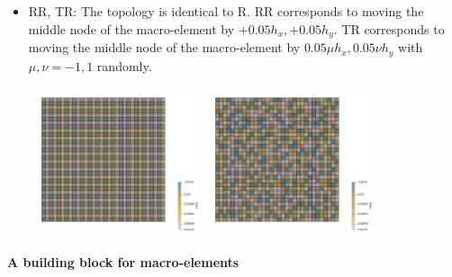 \begin{itemize}
\item RR, TR: The topology is identical to R. 
RR corresponds to moving the middle node of the macro-element by $+0.05h_x,+0.05h_y$.
TR corresponds to moving the middle node of the macro-element by $0.05\mu h_x,0.05\nu h_y$
with $\mu,\nu=-1,1$ randomly.

\begin{center}
\includegraphics[width=5cm]{python_codes/fieldstone_78/images/16x16/area8.png}
\includegraphics[width=5cm]{python_codes/fieldstone_78/images/16x16/area9.png}
\end{center}

\end{itemize}




\paragraph{A building block for macro-elements}


